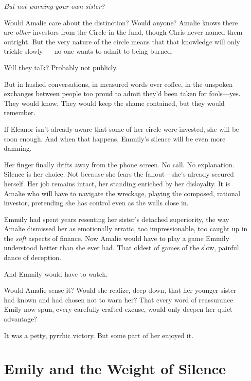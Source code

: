 \smallskip

\textit{But not warning your own sister?}  

Would Amalie care about the distinction? Would anyone?  Amalie knows there are \textit{other} investors from the Circle in the fund, though Chris never named them outright. But the very nature of the circle means that that knowledge will only trickle slowly — no one wants to admit to being burned.  

\smallskip

Will they talk?  Probably not publicly.  

\smallskip

But in hushed conversations, in measured words over coffee, in the unspoken exchanges between people too proud to admit they’d been taken for fools—yes. They would know.  They would keep the shame contained, but they would remember.  

If Eleanor isn’t already aware that some of her circle were invested, she will be soon enough. And when that happens, Emmily’s silence will be even more damning.  

\smallskip

Her finger finally drifts away from the phone screen. No call. No explanation.  Silence is her choice.  Not because she fears the fallout—she’s already secured herself. Her job remains intact, her standing enriched by her disloyalty. It is Amalie who will have to navigate the wreckage, playing the composed, rational investor, pretending she has control even as the walls close in.  

Emmily had spent years resenting her sister’s detached superiority, the way Amalie dismissed her as emotionally erratic, too impressionable, too caught up in the \textit{soft} aspects of finance.  Now Amalie would have to play a game Emmily understood better than she ever had. That oldest of games of the slow, painful dance of deception.  

And Emmily would have to watch.  

Would Amalie sense it? Would she realize, deep down, that her younger sister had known and had chosen not to warn her? That every word of reassurance Emily now spun, every carefully crafted excuse, would only deepen her quiet advantage?  

It was a petty, pyrrhic victory.  But some part of her enjoyed it. 

\section*{Emily and the Weight of Silence}

